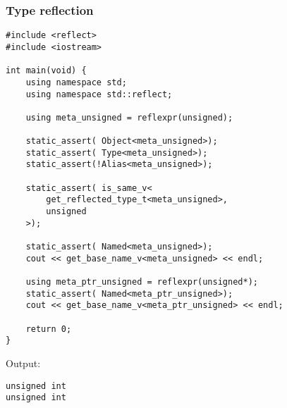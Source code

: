 \subsubsection{Type reflection}

\begin{verbatim}
#include <reflect>
#include <iostream>

int main(void) {
	using namespace std;
	using namespace std::reflect;

	using meta_unsigned = reflexpr(unsigned);

	static_assert( Object<meta_unsigned>);
	static_assert( Type<meta_unsigned>);
	static_assert(!Alias<meta_unsigned>);

	static_assert( is_same_v<
		get_reflected_type_t<meta_unsigned>,
		unsigned
	>);

	static_assert( Named<meta_unsigned>);
	cout << get_base_name_v<meta_unsigned> << endl;

	using meta_ptr_unsigned = reflexpr(unsigned*);
	static_assert( Named<meta_ptr_unsigned>);
	cout << get_base_name_v<meta_ptr_unsigned> << endl;

	return 0;
}
\end{verbatim}

Output:

\begin{verbatim}
unsigned int
unsigned int
\end{verbatim}

